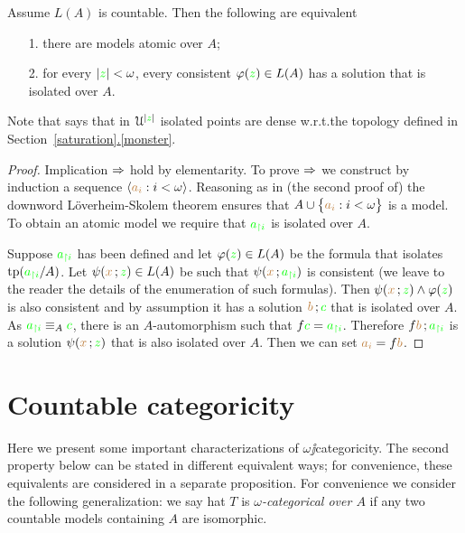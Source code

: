 \documentclass[creche.tex]{subfiles}
\begin{document}
\begin{proposition}\label{prop_idolated_type_dense}
Assume $L(A)$ is countable. Then the following are equivalent
\begin{itemize}
\item[1.] there are models atomic over $A$;
\item[2.] for every $|{\color{green} z}|<\omega$, every consistent $\varphi({\color{green} z})\in L(A)$ has a solution that is isolated over $A$.
\end{itemize}
\end{proposition} 
Note that  says that in $\EuScript U^{|{\color{green} z}|}$ isolated points are dense w.r.t.\@ the topology defined in Section~\hyperref[saturation]{\ref*{saturation}.\ref*{monster}}.
\begin{proof}
Implication $\Rightarrow$ hold by elementarity. To prove $\Rightarrow$ we construct by induction a sequence $\langle{\color{brown}a_i}:i<\omega\rangle$. Reasoning as in (the second proof of) the downword L\"overheim-Skolem theorem ensures that $A\cup\big\{{\color{brown} a_i}:i<\omega\big\}$ is a model. To obtain an atomic model we require that ${\color{green} a_{\restriction i}}$ is isolated over $A$. 

Suppose ${\color{green} a_{\restriction i}}$ has been defined and let $\varphi({\color{green} z})\in L(A)$ be the formula that isolates ${\rm tp}({\color{green} a_{\restriction i}}/A)$. Let $\psi({\color{brown} x}\,;{\color{green} z})\in L(A)$ be such that $\psi({\color{brown} x}\,;{\color{green} a_{\restriction i}})$ is consistent (we leave to the reader the details of the enumeration of such formulas). Then $\psi({\color{brown} x}\,;{\color{green} z})\wedge\varphi({\color{green} z})$ is also consistent and by assumption it has a solution ${\color{brown} b}\,;{\color{green} c}$ that is isolated over $A$. As ${\color{green} a_{\restriction i}}\equiv_A{\color{green} c}$, there is an $A$-automorphism such that $f{\color{green} c}={\color{green} a_{\restriction i}}$. Therefore $f{\color{brown} b}\,;{\color{green} a_{\restriction i}}$ is a solution $\psi({\color{brown} x}\,;{\color{green} z})$ that is also isolated over $A$. Then we can set ${\color{brown} a_i}=f{\color{brown} b}$. 
\end{proof}


\section{Countable categoricity}

Here we present some important characterizations of $\omega\jj$categoricity. The second property below can be stated in different equivalent ways; for convenience, these equivalents are considered in a separate proposition. For convenience we consider the following generalization: we say hat $T$ is \emph{$\omega$-categorical over $A$\/} if any two countable models containing $A$ are isomorphic.
\end{document}
